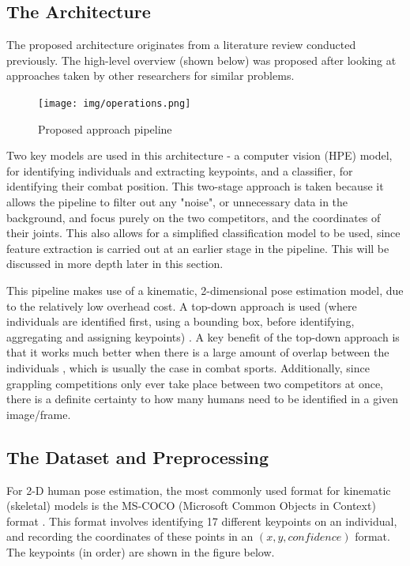 \documentclass[a4paper, oneside, 11pt]{article}
\begin{document}
\subsection{The Architecture}

The proposed architecture originates from a literature review conducted previously. The high-level overview (shown below) was proposed after looking at approaches taken by other researchers for similar problems. 

\bigskip
\begin{figure}[h]
    \centering
    \texttt{[image: img/operations.png]}
    \caption{Proposed approach pipeline}
    \label{fig:grapplingpositions}
\end{figure}

\bigskip
\noindent
Two key models are used in this architecture - a computer vision (HPE) model, for identifying individuals and extracting keypoints, and a classifier, for identifying their combat position. This two-stage approach is taken because it allows the pipeline to filter out any "noise", or unnecessary data in the background, and focus purely on the two competitors, and the coordinates of their joints. This also allows for a simplified classification model to be used, since feature extraction is carried out at an earlier stage in the pipeline. This will be discussed in more depth later in this section.

\bigskip
\noindent
This pipeline makes use of a kinematic, 2-dimensional pose estimation model, due to the relatively low overhead cost. A top-down approach is used (where individuals are identified first, using a bounding box, before identifying, aggregating and assigning keypoints) \cite{HPEGuide}. A key benefit of the top-down approach is that it works much better when there is a large amount of overlap between the individuals \cite{HPEDeepLearningMethods}, which is usually the case in combat sports. Additionally, since grappling competitions only ever take place between two competitors at once, there is a definite certainty to how many humans need to be identified in a given image/frame.

\subsection{The Dataset and Preprocessing}
For 2-D human pose estimation, the most commonly used format for kinematic (skeletal) models is the MS-COCO (Microsoft Common Objects in Context) format \cite{MSCOCO}. This format involves identifying 17 different keypoints on an individual, and recording the coordinates of these points in an $(x, y, \textit{confidence})$ format. The keypoints (in order) are shown in the figure below.
\end{document}
